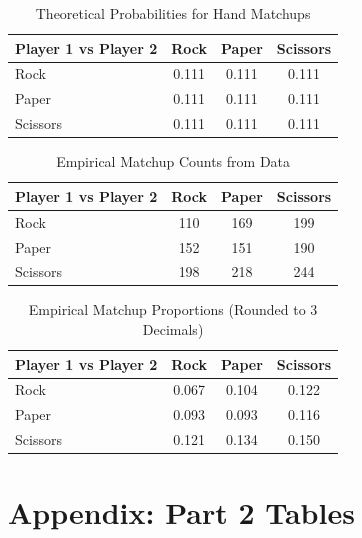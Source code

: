 \documentclass[12pt]{article}
\begin{document}
\begin{table}[H]
\centering
\caption{Theoretical Probabilities for Hand Matchups}
\label{tab:theoretical_matrix}
\begin{tabular}{lccc}
\toprule
\textbf{Player 1 vs Player 2} & \textbf{Rock} & \textbf{Paper} & \textbf{Scissors} \\
\midrule
Rock     & 0.111 & 0.111 & 0.111 \\
Paper    & 0.111 & 0.111 & 0.111 \\
Scissors & 0.111 & 0.111 & 0.111 \\
\bottomrule
\end{tabular}
\end{table}

\begin{table}[H]
\centering
\caption{Empirical Matchup Counts from Data}
\label{tab:empirical_counts}
\begin{tabular}{lccc}
\toprule
\textbf{Player 1 vs Player 2} & \textbf{Rock} & \textbf{Paper} & \textbf{Scissors} \\
\midrule
Rock     & 110 & 169 & 199 \\
Paper    & 152 & 151 & 190 \\
Scissors & 198 & 218 & 244 \\
\bottomrule
\end{tabular}
\end{table}

\begin{table}[H]
\centering
\caption{Empirical Matchup Proportions (Rounded to 3 Decimals)}
\label{tab:empirical_proportions}
\begin{tabular}{lccc}
\toprule
\textbf{Player 1 vs Player 2} & \textbf{Rock} & \textbf{Paper} & \textbf{Scissors} \\
\midrule
Rock     & 0.067 & 0.104 & 0.122 \\
Paper    & 0.093 & 0.093 & 0.116 \\
Scissors & 0.121 & 0.134 & 0.150 \\
\bottomrule
\end{tabular}
\end{table}

\newpage
\appendix
\section*{Appendix: Part 2 Tables}
\end{document}
